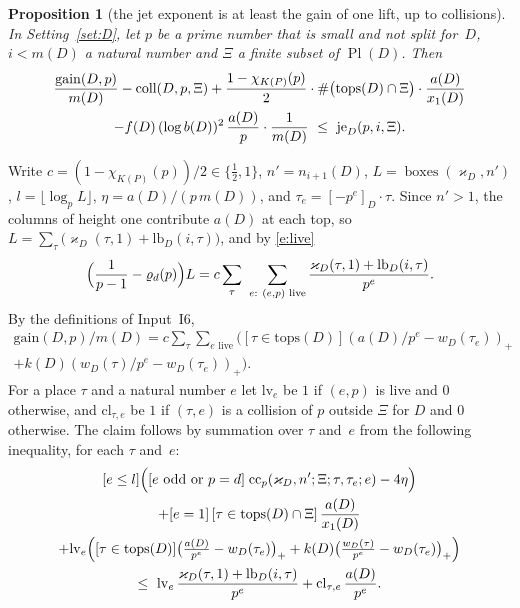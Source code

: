 \documentclass[11pt,a4paper]{article}
\makeatletter
\theoremstyle{plainx}
\newtheorem{proposition}[theorem]{Proposition}
\theoremstyle{uprightx}
\renewenvironment{proof}[1][Proof]{\par\pushQED{\qed}\normalfont\topsep0pt\partopsep0pt
  \trivlist\item[\hskip\labelsep\itshape #1.]\ignorespaces}{\popQED\endtrivlist\@endpefalse}
\newcommand{\KP}[1]{K(#1)}
\newcommand{\chiK}[1]{\chi_{\KP{#1}}}
\newcommand{\xoD}[1]{x_1(#1)}
\newcommand{\bD}[1]{b(#1)}
\newcommand{\mD}[1]{m(#1)}
\newcommand{\PlD}[1]{\operatorname{Pl}(#1)}
\newcommand{\fD}[1]{f(#1)}
\newcommand{\kD}[1]{k(#1)}
\newcommand{\aD}[1]{a(#1)}
\newcommand{\tops}[1]{\mathrm{tops}(#1)}
\newcommand{\nomW}[2]{w_{#1}(#2)}
\newcommand{\pin}[2]{[#2]_{#1}}
\newcommand{\nD}[2]{n_{#2}(#1)}
\newcommand{\gain}[2]{\mathrm{gain}(#1,#2)}
\newcommand{\coll}[3]{\mathrm{coll}(#1,#2,#3)}
\newcommand{\cc}[7]{\mathrm{cc}_{#1}(#2,#3;#4;#5,#6;#7)}
\newcommand{\kap}[3]{\varkappa_{#1}(#2,#3)}
\newcommand{\kapD}[1]{\varkappa_{#1}}
\newcommand{\nsw}[2]{\varrho_{#1}(#2)}
\newcommand{\lb}[3]{\mathrm{lb}_{#1}(#2,#3)}
\newcommand{\boxes}[2]{\operatorname{boxes}(#1,#2)}
\makeatother
\begin{document}
\begin{proposition}[the jet exponent is at least the gain of one lift, up to collisions]\label{p:jet}
In Setting~\ref{set:D}, let $p$ be a prime number that is small and not split for~$D$, $i<\mD{D}$ a natural number
and $\Xi$ a finite subset of\/ $\PlD{D}$. Then
\begin{multline*}
\frac{\gain{D}{p}}{\mD{D}}-\coll{D}{p}{\Xi}+\frac{1-\chiK{P}(p)}{2}\cdot\#\bigl(\tops{D}\cap\Xi\bigr)\cdot\frac{\aD{D}}{\xoD{D}}\\
-\fD{D}\,(\log \bD{D})^2\,\frac{\aD{D}}{p}\cdot\frac{1}{\mD{D}}\ \le\ \jetexp{p}{i}{\Xi}.
\end{multline*}
\end{proposition}
\begin{proof}
Write $c=(1-\chiK{P}(p))/2\in\{\tfrac12,1\}$, $n'=\nD{D}{i+1}$, $L=\boxes{\kapD{D}}{n'}$,
$l=\lfloor\log_pL\rfloor$, $\eta=\aD{D}/(p\,\mD{D})$, and $\tau_e=\pin{D}{-p^{e}}\cdot\tau$. Since $n'>1$, the columns
of height one contribute $\aD{D}$ at each top, so $L=\sum_\tau\bigl(\kap{D}{\tau}{1}+\lb{D}{i}{\tau}\bigr)$, and
by \eqref{e:live}
\[\Bigl(\frac1{p-1}-\nsw{d}{p}\Bigr)L=c\sum_{\tau}\ \sum_{e:\ (e,p)\text{ live}}\frac{\kap{D}{\tau}{1}+\lb{D}{i}{\tau}}{p^{e}}.\]
By the definitions of Input~I6,
\begin{multline*}\gain{D}{p}/\mD{D}=c\sum_\tau\sum_{e\text{ live}}\bigl([\tau\in\tops{D}](\aD{D}/p^{e}-\nomW{D}{\tau_e})_+\\+\kD{D}(\nomW{D}{\tau}/p^{e}-\nomW{D}{\tau_e})_+\bigr).\end{multline*}
For a place $\tau$ and a natural number $e$ let $\mathrm{lv}_e$ be $1$ if $(e,p)$ is live and $0$ otherwise,
and $\mathrm{cl}_{\tau,e}$ be $1$ if $(\tau,e)$ is a collision of $p$ outside $\Xi$ for $D$ and $0$ otherwise.
The claim follows by summation over $\tau$ and~$e$ from the following inequality, for each $\tau$ and~$e$:
\begin{multline}\label{e:term}
[e\le l]\Bigl([e\text{ odd or }p=d]\;\cc{p}{\kapD{D}}{n'}{\Xi}{\tau}{\tau_e}{e}-4\eta\Bigr)\\+[e=1]\,[\tau\in\tops{D}\cap\Xi]\,\frac{\aD{D}}{\xoD{D}}\\
+\mathrm{lv}_e\Bigl([\tau\in\tops{D}]\bigl(\tfrac{\aD{D}}{p^{e}}-\nomW{D}{\tau_e}\bigr)_++\kD{D}\bigl(\tfrac{\nomW{D}{\tau}}{p^{e}}-\nomW{D}{\tau_e}\bigr)_+\Bigr)\\
\le\ \mathrm{lv}_e\,\frac{\kap{D}{\tau}{1}+\lb{D}{i}{\tau}}{p^{e}}+\mathrm{cl}_{\tau,e}\,\frac{\aD{D}}{p^{e}} .
\end{multline}

\end{proof}
\end{document}

